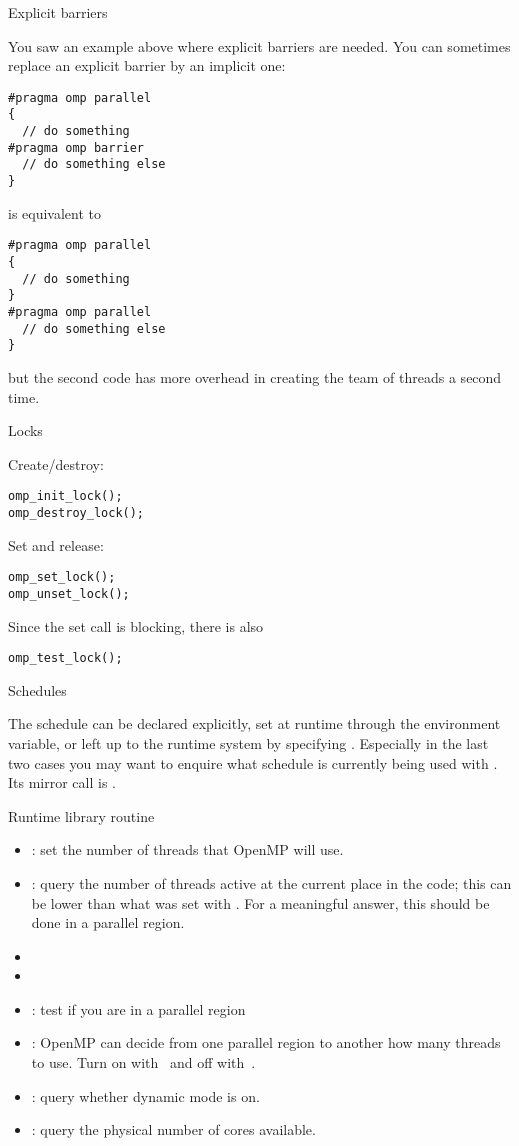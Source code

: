  {Explicit barriers}

You saw an example above where explicit barriers are needed.
You can sometimes replace an explicit barrier by an implicit one:
\begin{verbatim}
#pragma omp parallel
{
  // do something
#pragma omp barrier
  // do something else
}
\end{verbatim}
is equivalent to
\begin{verbatim}
#pragma omp parallel
{
  // do something
}
#pragma omp parallel
  // do something else
}
\end{verbatim}
but the second code has more overhead in creating the team of threads a second time.

 {Locks}

Create/destroy:
\begin{verbatim}
omp_init_lock();
omp_destroy_lock();
\end{verbatim}
Set and release:
\begin{verbatim}
omp_set_lock();
omp_unset_lock();
\end{verbatim}
Since the set call is blocking, there is also 
\begin{verbatim}
omp_test_lock();
\end{verbatim}

 {Schedules}

The schedule can be declared explicitly, set at runtime
through the  environment variable, or left up to the runtime system
by specifying . Especially in the last two cases  you may want to enquire
what schedule is currently being used with
. Its mirror call is .

 {Runtime library routine}

\begin{itemize}
\item{}: set the number of threads that OpenMP will use.
\item{}: query the number of threads
  active at the current place in the code; this can be lower than what
  was set with . For a meaningful answer, this
  should be done in a parallel region.
\item{}
\item{}
\item{}: test if you are in a parallel region
\item{}: OpenMP can decide from one
  parallel region to another how many threads to use. Turn on
  with~ and off with~.
\item{}: query whether dynamic mode is on.
\item{}: query the physical number of cores available.
\end{itemize}

